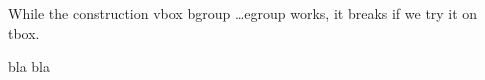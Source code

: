 %




While the construction vbox bgroup \dots egroup works, it breaks if we
try it on tbox.

\vbox\bgroup bla bla\egroup

\bye
